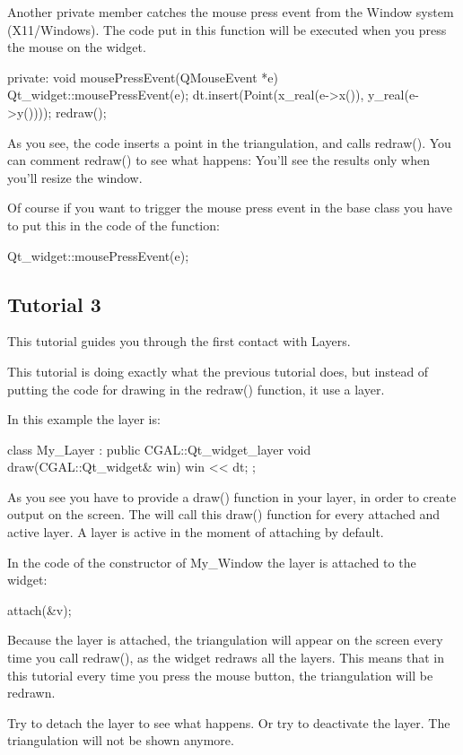 Another private member catches the mouse press event from the Window
system (X11/Windows). The code put in this function will be executed when
you press the mouse on the widget.
\begin{ccExampleCode}
private:
  void mousePressEvent(QMouseEvent *e)
  {
    Qt_widget::mousePressEvent(e);
    dt.insert(Point(x_real(e->x()), y_real(e->y())));
    redraw();
  }
\end{ccExampleCode}
As you see, the code inserts a point in the triangulation, and calls
redraw(). You can comment redraw() to see what happens: You'll see
the results only when you'll resize the window.

Of course if you want to trigger the mouse press event in the base
class you have to put this in the code of the function:
\begin{ccExampleCode}
Qt_widget::mousePressEvent(e);
\end{ccExampleCode}

\subsection*{Tutorial 3}

This tutorial guides you through the first contact with Layers.

This tutorial is doing exactly what the previous tutorial does, but
instead of putting the code for drawing in the redraw() function, it use a
layer.

In this example the layer is:
\begin{ccExampleCode}
class My_Layer : public CGAL::Qt_widget_layer{
  void draw(CGAL::Qt_widget& win){
    win << dt;
  }
};
\end{ccExampleCode}
As you see you have to provide a draw() function in your layer, in
order to create output on the screen. The  will call this
draw() function for every attached and active layer. A layer is active
in the moment of attaching by default.

In the code of the constructor of My\_Window the layer is attached to
the widget:
\begin{ccExampleCode}
attach(&v);
\end{ccExampleCode}
Because the layer is attached, the triangulation will appear on the
screen every time you call redraw(), as the widget redraws all the
layers. This means that in this tutorial every time you press the mouse
button, the triangulation will be redrawn.

Try to detach the layer to see what happens. Or try to deactivate
the layer. The triangulation will not be shown anymore.

